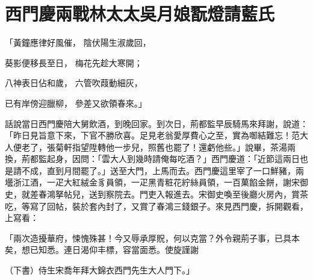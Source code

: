 %

\chapter{西門慶兩戰林太太\KG 吳月娘翫燈請藍氏}


「黃鐘應律好風催，  陰伏陽生淑歲回，

葵影便移長至日，  梅花先趁大寒開；

八神表日佔和歲，  六管吹葭動細灰，

已有岸傍迎臘柳，  參差又欲領春來。」

話說當日西門慶陪大舅飲酒，到晚回家。到次日，荊都監早辰騎馬來拜謝，說道：「昨日見旨意下來，下官不勝欣喜。足見老翁愛厚費心之至，實為啣結難忘！范大人便老了，張菊軒指望陞轉他一步兒，照舊也罷了！還虧他些。」說畢，茶湯兩換，荊都監起身，因問：「雲大人到幾時請俺每吃酒？」西門慶道：「近節這兩日也是請不成，直到月間罷了。」送至大門，上馬而去。西門慶這里宰了一口鮮豬，兩壜浙江酒，一疋大紅絨金豸員領，一疋黑青粧花紵絲員領，一百菓餡金餅，謝宋御史，就差春鴻拏帖兒，送到察院去。門吏入報進去。宋御史喚至後廳火房內，賞茶吃，等寫了回帖，裝於套內封了，又賞了春鴻三錢銀子。來見西門慶，拆開觀看，上寫看：

「兩次造擾華府，悚愧殊甚！今又辱承厚貺，何以克當？外令親荊子事，已具本矣，想已知悉。連日渴仰丰標，容當面悉。使旋謹謝

（下書）侍生宋喬年拜大錦衣西門先生大人門下。」

